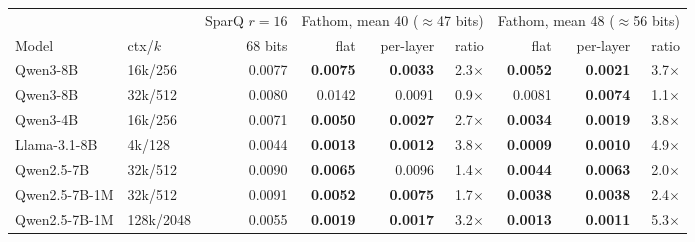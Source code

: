 \begin{tabular}{llrrrrrrr}
\toprule
 & & SparQ $r{=}16$ & \multicolumn{3}{c}{Fathom, mean 40 ($\approx$47 bits)} & \multicolumn{3}{c}{Fathom, mean 48 ($\approx$56 bits)} \\
Model & ctx/$k$ & 68 bits & flat & per-layer & ratio & flat & per-layer & ratio \\
\midrule
Qwen3-8B & 16k/256 & 0.0077 & \textbf{0.0075} & \textbf{0.0033} & 2.3$\times$ & \textbf{0.0052} & \textbf{0.0021} & 3.7$\times$ \\
Qwen3-8B & 32k/512 & 0.0080 & 0.0142 & 0.0091 & 0.9$\times$ & 0.0081 & \textbf{0.0074} & 1.1$\times$ \\
Qwen3-4B & 16k/256 & 0.0071 & \textbf{0.0050} & \textbf{0.0027} & 2.7$\times$ & \textbf{0.0034} & \textbf{0.0019} & 3.8$\times$ \\
Llama-3.1-8B & 4k/128 & 0.0044 & \textbf{0.0013} & \textbf{0.0012} & 3.8$\times$ & \textbf{0.0009} & \textbf{0.0010} & 4.9$\times$ \\
Qwen2.5-7B & 32k/512 & 0.0090 & \textbf{0.0065} & 0.0096 & 1.4$\times$ & \textbf{0.0044} & \textbf{0.0063} & 2.0$\times$ \\
Qwen2.5-7B-1M & 32k/512 & 0.0091 & \textbf{0.0052} & \textbf{0.0075} & 1.7$\times$ & \textbf{0.0038} & \textbf{0.0038} & 2.4$\times$ \\
Qwen2.5-7B-1M & 128k/2048 & 0.0055 & \textbf{0.0019} & \textbf{0.0017} & 3.2$\times$ & \textbf{0.0013} & \textbf{0.0011} & 5.3$\times$ \\
\bottomrule
\end{tabular}